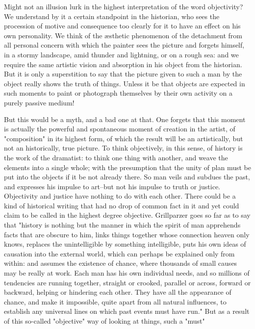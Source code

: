 Might not an illusion lurk in the highest interpretation of the word
objectivity? We understand by it a certain standpoint in the
historian, who sees the procession of motive and consequence too
clearly for it to have an effect on his own personality. We think of
the æsthetic phenomenon of the detachment from all personal concern
with which the painter sees the picture and forgets himself, in a
stormy landscape, amid thunder and lightning, or on a rough sea: and
we require the same artistic vision and absorption in his object from
the historian. But it is only a superstition to say that the picture
given to such a man by the object really shows the truth of things.
Unless it be that objects are expected in such moments to paint or
photograph themselves by their own activity on a purely passive
medium!

But this would be a myth, and a bad one at that. One forgets that
this moment is actually the powerful and spontaneous moment of
creation in the artist, of "composition" in its highest form, of
which the result will be an artistically, but not an historically,
true picture. To think objectively, in this sense, of history is the
work of the dramatist: to think one thing with another, and weave the
elements into a single whole; with the presumption that the unity of
plan must be put into the objects if it be not already there. So man
veils and subdues the past, and expresses his impulse to art--but not
his impulse to truth or justice. Objectivity and justice have nothing
to do with each other. There could be a kind of historical writing
that had no drop of common fact in it and yet could claim to be
called in the highest degree objective. Grillparzer goes so far as to
say that "history is nothing but the manner in which the spirit of
man apprehends facts that are obscure to him, links things together
whose connection heaven only knows, replaces the unintelligible by
something intelligible, puts his own ideas of causation into the
external world, which can perhaps be explained only from within: and
assumes the existence of chance, where thousands of small causes may
be really at work. Each man has his own individual needs, and so
millions of tendencies are running together, straight or crooked,
parallel or across, forward or backward, helping or hindering each
other. They have all the appearance of chance, and make it
impossible, quite apart from all natural influences, to establish any
universal lines on which past events must have run." But as a result
of this so-called "objective" way of looking at things, such a "must"
